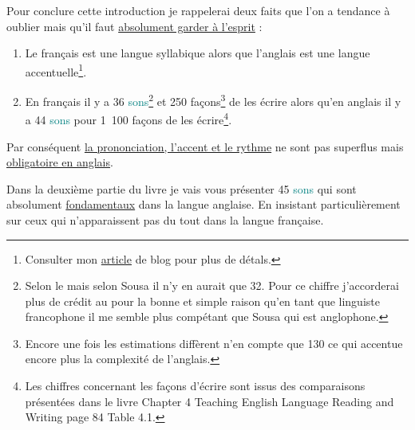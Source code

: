 Pour conclure cette introduction je rappelerai deux faits que l'on a tendance à oublier mais qu'il faut \underline{absolument garder à l'esprit} :

\begin{enumerate}
\item Le français est une langue syllabique alors que l'anglais est
  une langue accentuelle\footnote{Consulter mon \href{http://doyouspeakenglish.fr/laccent-tonique-en-anglais/}{article} de
    blog pour plus de détals.}.
\item En français il y a 36 \textcolor{teal}{sons}\footnote{Selon le  mais selon Sousa il
    n'y en aurait que 32. Pour ce chiffre j'accorderai plus de crédit
    au \GE pour la bonne et simple raison qu'en tant que linguiste
    francophone il me semble plus compétant que Sousa qui est
    anglophone.} et 250 façons\footnote{Encore une fois les
    estimations diffèrent \GE n'en compte que 130 ce qui accentue
    encore plus la complexité de l'anglais.} de les écrire alors qu'en
  anglais il y a 44 \textcolor{teal}{sons} pour 1~100 façons de les écrire\footnote{Les
    chiffres concernant les façons d'écrire sont issus des
    comparaisons présentées dans le livre \HTEBL Chapter 4 Teaching
    English Language Reading and Writing page 84 Table 4.1.}.
\end{enumerate}

Par conséquent \underline{la prononciation, l'accent et le rythme} ne sont pas
superflus mais \underline{obligatoire en anglais}.\par

Dans la deuxième partie du livre je vais vous présenter 45
\textcolor{teal}{sons} qui sont absolument \underline{fondamentaux}
dans la langue anglaise. En insistant particulièrement sur ceux qui
n'apparaissent pas du tout dans la langue française. %

